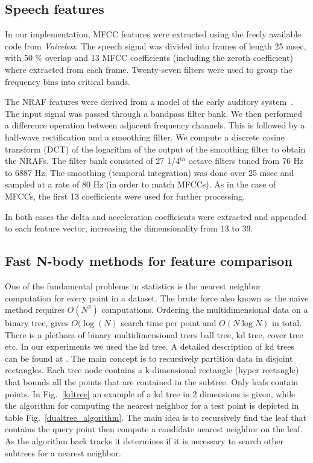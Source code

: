 \documentclass[12pt,letterpaper,doublespaced,ETD,dvips,proposal]{gtthesis}
\begin{document}
\begin{Body}
\subsection{Speech features} In our implementation, MFCC features
were extracted using the freely available code from \emph{Voicebox}.
The speech signal was divided into frames of length 25 msec, with 50
\% overlap and 13 MFCC coefficients (including the zeroth
coefficient) where extracted from each frame. Twenty-seven filters
were used to group the frequency bins into critical bands.

The NRAF features were derived from a model of the early auditory
system~\cite{shamma_main}. The input signal was passed through a
bandpass filter bank. We then performed a difference operation
between adjacent frequency channels. This is followed by a half-wave
rectification and a smoothing filter. We compute a discrete cosine
transform (DCT) of the logarithm of the output of the smoothing
filter to obtain the NRAFs. The filter bank consisted of 27
1/4$^{th}$ octave filters tuned from 76 Hz to 6887 Hz. The smoothing
(temporal integration) was done over 25 msec and sampled at a rate
of 80 Hz (in order to match MFCCs). As in the case of MFCCs, the
first 13 coefficients were used for further processing.

In both cases the delta and acceleration coefficients were extracted
and appended to each feature vector, increasing the dimensionality
from 13 to 39.

\subsection{Fast N-body methods for feature comparison} One of the
fundamental problems in statistics is the nearest neighbor
computation for every point in a dataset. The brute force also known
as the naive method requires $O(N^2)$ computations. Ordering the
multidimensional data on a binary tree, gives $O(\log (N)$ search
time per point and $O(N\log N)$ in total. There is a plethora of
binary multidimensional trees ball tree, kd tree, cover tree etc. In
our experiments we used the kd tree. A detailed description of kd
trees can be found at \cite{moore-tutorial}. The main concept is to
recursively partition data in disjoint rectangles. Each tree node
contains a k-dimensional rectangle (hyper rectangle) that bounds all
the points that are contained in the subtree. Only leafs contain
points. In Fig.~\ref{kdtree} an example of a kd tree in 2 dimensions
is given, while the algorithm for computing the nearest neighbor for
a test point is depicted in table Fig.~\ref{dualtree_algorithm}. The
main idea is to recursively find the leaf that contains the query
point then compute a candidate nearest neighbor on the leaf. As the
algorithm back tracks it determines if it is necessary to search
other subtrees for a nearest neighbor.


\end{Body}
\end{document}
